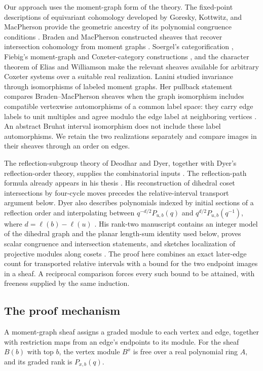 Our approach uses the moment-graph form of the theory.
The fixed-point descriptions of equivariant cohomology developed by
Goresky, Kottwitz, and MacPherson provide the geometric ancestry of its
polynomial congruence conditions \cite{GKM98}.
Braden and MacPherson constructed sheaves that recover intersection
cohomology from moment graphs \cite[Theorems~1.5--1.6]{BM01}.
Soergel's categorification \cite{Soergel07}, Fiebig's moment-graph and
Coxeter-category constructions \cite{FiebigVerma08,Fiebig08,FiebigSurvey},
and the character theorem of Elias and Williamson \cite{EW14} make the
relevant sheaves available for arbitrary Coxeter systems over a suitable
real realization.
Lanini studied invariance through isomorphisms of labeled moment graphs.
Her pullback statement compares Braden--MacPherson sheaves when the graph
isomorphism includes compatible vertexwise automorphisms of a common label
space: they carry edge labels to unit multiples and agree modulo the edge
label at neighboring vertices
\cite[Definitions~2.3--2.4, Lemma~5.1, and Remark~5.1]{Lanini12}.
An abstract Bruhat interval isomorphism does not include these label
automorphisms. We retain the two realizations separately and compare
images in their sheaves through an order on edges.

The reflection-subgroup theory of Deodhar and Dyer, together with Dyer's
reflection-order theory, supplies the combinatorial inputs
\cite{Deodhar89,Dyer87,Dyer90,Dyer91,Dyer93}.
The reflection-path formula already appears in his thesis
\cite[Theorem~6.23]{Dyer87}.
His reconstruction of dihedral coset intersections by four-cycle moves
\cite[Section~3.4]{Dyer91} precedes the relative-interval transport
argument below. Dyer also describes polynomials indexed by initial
sections of a reflection order and interpolating between
$q^{-d/2}P_{u,b}(q)$ and $q^{d/2}P_{u,b}(q^{-1})$, where
$d=\ell(b)-\ell(u)$ \cite[Introduction]{Dyer93}.
His rank-two manuscript contains an integer model of the dihedral graph
and the planar length-sum identity used below, proves scalar congruence
and intersection statements, and sketches localization of projective
modules along cosets
\cite[Sections~1.9--1.11 and~3.16]{DyerRankTwo}.
The proof here combines an exact later-edge count for transported relative
intervals with a bound for the two endpoint images in a sheaf. A
reciprocal comparison forces every such bound to be attained, with
freeness supplied by the same induction.

\subsection{The proof mechanism}
A moment-graph sheaf assigns a graded module to each vertex and edge,
together with restriction maps from an edge's endpoints to its module.
For the sheaf $B(b)$ with top $b$, the vertex module $B^x$ is free over a
real polynomial ring $A$, and its graded rank is $P_{x,b}(q)$.

